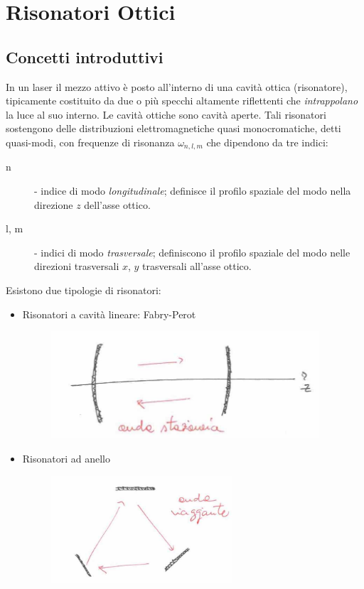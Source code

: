 \chapter{Risonatori Ottici}
\graphicspath{{./cap_4/images/}}

\section{Concetti introduttivi}
In un laser il mezzo attivo è posto all'interno di una cavità ottica (risonatore), tipicamente costituito da due o più specchi altamente riflettenti che \textit{intrappolano} la luce al suo interno.
Le cavità ottiche sono cavità aperte. Tali risonatori sostengono delle distribuzioni elettromagnetiche quasi monocromatiche, detti quasi-modi, con frequenze di risonanza $\omega_{n,l,m}$ che dipendono da tre indici:
\begin{description}
\item [n] - indice di modo \textit{longitudinale}; definisce il profilo spaziale del modo nella direzione $z$ dell'asse ottico.
\item [l, m] - indici di modo \textit{trasversale}; definiscono il profilo spaziale del modo nelle direzioni trasversali $x$, $y$ trasversali all'asse ottico.
\end{description}
Esistono due tipologie di risonatori:
\begin{itemize}
\item Risonatori a cavità lineare: Fabry-Perot
\begin{figure}[H]
\centering
\includegraphics[height=4cm]{images/8}
\end{figure}
\item Risonatori ad anello
\begin{figure}[H]
\centering
\includegraphics[height=4cm]{images/9}
\end{figure}
\end{itemize}
